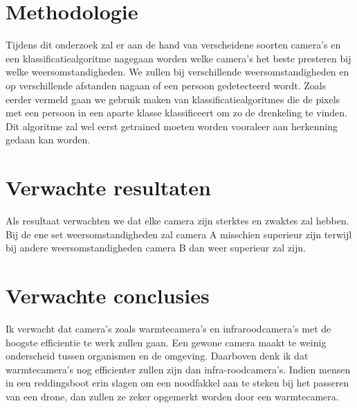 \section{Methodologie}
\label{sec:methodologie}

Tijdens dit onderzoek zal er aan de hand van verscheidene soorten camera's en een klassificatiealgoritme nagegaan worden welke camera's het beste presteren bij welke weersomstandigheden. We zullen bij verschillende weersomstandigheden en op verschillende afstanden nagaan of een persoon gedetecteerd wordt. Zoals eerder vermeld gaan we gebruik maken van klassificatiealgoritmes die de pixels met een persoon in een aparte klasse klassificeert om zo de drenkeling te vinden. Dit algoritme zal wel eerst getrained moeten worden vooraleer aan herkenning gedaan kan worden.

\section{Verwachte resultaten}
\label{sec:verwachte_resultaten}

Als resultaat verwachten we dat elke camera zijn sterktes en zwaktes zal hebben. Bij de ene set weersomstandigheden zal camera A misschien superieur zijn terwijl bij andere weersomstandigheden camera B dan weer superieur zal zijn. 

\section{Verwachte conclusies}
\label{sec:verwachte_conclusies}

Ik verwacht dat camera's zoals warmtecamera's en infraroodcamera's met de hoogste efficientie te werk zullen gaan. Een gewone camera maakt te weinig onderscheid tussen organismen en de omgeving. Daarboven denk ik dat warmtecamera's nog efficienter zullen zijn dan infra-roodcamera's. Indien mensen in een reddingsboot erin slagen om een noodfakkel aan te steken bij het passeren van een drone, dan zullen ze zeker opgemerkt worden door een warmtecamera. 

